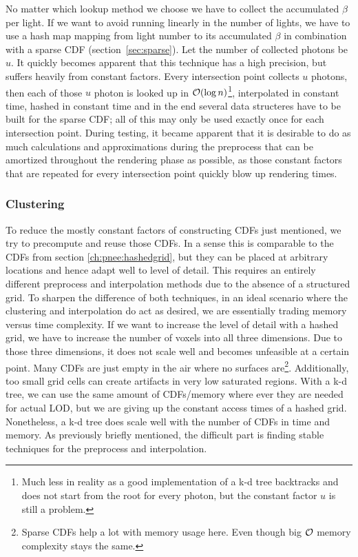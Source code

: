 No matter which lookup method we choose we have to collect the accumulated $\beta$ per light. If we want to avoid running linearly in the number of lights, we have to use a hash map mapping from light number to its accumulated $\beta$ in combination with a sparse CDF (section~\ref{sec:sparse}). Let the number of collected photons be $u$. It quickly becomes apparent that this technique has a high precision, but suffers heavily from constant factors. Every intersection point collects $u$ photons, then each of those $u$ photon is looked up in $\mathcal{O}(\log n)$\footnote{Much less in reality as a good implementation of a k-d tree backtracks and does not start from the root for every photon, but the constant factor $u$ is still a problem.}, interpolated in constant time, hashed in constant time and in the end several data structeres have to be built for the sparse CDF; all of this may only be used exactly once for each intersection point. During testing, it became apparent that it is desirable to do as much calculations and approximations during the preprocess that can be amortized throughout the rendering phase as possible, as those constant factors that are repeated for every intersection point quickly blow up rendering times.

\subsubsection{Clustering}

To reduce the mostly constant factors of constructing CDFs just mentioned, we try to precompute and reuse those CDFs. In a sense this is comparable to the CDFs from section \ref{ch:pnee:hashedgrid}, but they can be placed at arbitrary locations and hence adapt well to level of detail. This requires an entirely different preprocess and interpolation methods due to the absence of a structured grid. To sharpen the difference of both techniques, in an ideal scenario where the clustering and interpolation do act as desired, we are essentially trading memory versus time complexity. If we want to increase the level of detail with a hashed grid, we have to increase the number of voxels into all three dimensions. Due to those three dimensions, it does not scale well and becomes unfeasible at a certain point. Many CDFs are just empty in the air where no surfaces are\footnote{Sparse CDFs help a lot with memory usage here. Even though big $\mathcal{O}$ memory complexity stays the same.}. Additionally, too small grid cells can create artifacts in very low saturated regions. With a k-d tree, we can use the same amount of CDFs/memory where ever they are needed for actual LOD, but we are giving up the constant access times of a hashed grid. Nonetheless, a k-d tree does scale well with the number of CDFs in time and memory. As previously briefly mentioned, the difficult part is finding stable techniques for the preprocess and interpolation.

